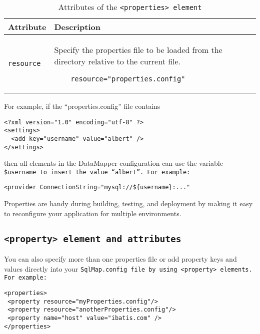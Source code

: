 \begin{table}[!hpt]
\caption{Attributes of the \tt{<properties>} element} \label{table:4.3}
\centering
\begin{tabular}{|l|l|}
 \hline
 \textbf{Attribute} & \textbf{Description} \\
 \hline
 \tt{resource} &
  \begin{minipage}{0.7\textwidth}\vspace{2mm}
    Specify the properties file to be loaded from the directory relative to
    the current file.
    \vspace{-3mm}\begin{verbatim}
    resource="properties.config"
    \end{verbatim}\vspace{-5mm}
  \end{minipage}
  \\
  \hline
\end{tabular}
\end{table}

For example, if the ``properties.config'' file contains

\begin{verbatim}
<?xml version="1.0" encoding="utf-8" ?>
<settings>
  <add key="username" value="albert" />
</settings>
\end{verbatim}

then all elements in the DataMapper configuration can use the variable
\tt{\${username}} to insert the value ``albert''. For example:

\begin{verbatim}
<provider ConnectionString="mysql://${username}:..."
\end{verbatim}

Properties are handy during building, testing, and deployment by making it
easy to reconfigure your application for multiple environments.

\subsection{\tt{<property>} element and attributes}
You can also specify more than one properties file or add property keys and
values directly into your \tt{SqlMap.config} file by using \tt{<property>}
elements. For example:

\begin{verbatim}
<properties>
 <property resource="myProperties.config"/>
 <property resource="anotherProperties.config"/>
 <property name="host" value="ibatis.com" />
</properties>
\end{verbatim}

